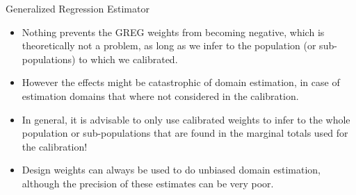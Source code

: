 \documentclass[10pt]{beamer}\usepackage[]{graphicx}\usepackage[]{color}
\begin{document}
\begin{frame}{Generalized Regression Estimator}
\begin{itemize}
  \item<1-> Nothing prevents the GREG weights from becoming negative, which is theoretically not a problem, as long as we infer to the population (or sub-populations) to which we calibrated. 
  \item<2-> However the effects might be catastrophic of domain estimation, in case of estimation domains that where not considered in the calibration. 
  \item<3-> In general, it is advisable to only use calibrated weights to infer to the whole population or sub-populations that are found in the marginal totals used for the calibration!
  \item<4> Design weights can always be used to do unbiased domain estimation, although the precision of these estimates can be very poor.
\end{itemize}
\end{frame}
\end{document}
